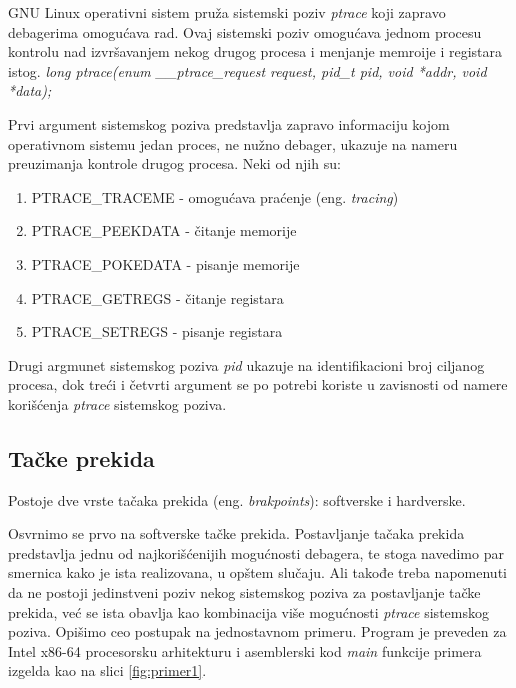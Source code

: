 \documentclass[12pt,oneside]{memoir}
\begin{document}
GNU Linux operativni sistem pruža sistemski poziv \emph{ptrace} koji zapravo debagerima omogućava rad. Ovaj sistemski poziv omogućava jednom procesu kontrolu nad izvršavanjem nekog drugog procesa i menjanje memroije i registara istog.
\newline\newline
\emph{ long ptrace(enum \_\_ptrace\_request request, pid\_t pid, void *addr, void *data);}
\newline

Prvi argument sistemskog poziva predstavlja zapravo informaciju kojom operativnom sistemu jedan proces, ne nužno debager, ukazuje na nameru preuzimanja kontrole drugog procesa. Neki od njih su:

\begin{enumerate}
	\item PTRACE\_TRACEME - omogućava praćenje (eng. \emph{tracing})
	\item PTRACE\_PEEKDATA - čitanje memorije
	\item PTRACE\_POKEDATA - pisanje memorije
	\item PTRACE\_GETREGS - čitanje registara
	\item PTRACE\_SETREGS - pisanje registara
\end{enumerate}
Drugi argmunet sistemskog poziva \emph{pid} ukazuje na identifikacioni broj ciljanog procesa, dok treći i četvrti argument se po potrebi koriste u zavisnosti od namere korišćenja \emph{ptrace} sistemskog poziva. 
\subsection{Tačke prekida}

Postoje dve vrste tačaka prekida (eng. \emph{brakpoints}): softverske i hardverske.

Osvrnimo se prvo na softverske tačke prekida. Postavljanje tačaka prekida predstavlja jednu od najkorišćenijih mogućnosti debagera, te stoga navedimo par smernica kako je ista realizovana, u opštem slučaju. Ali takođe treba napomenuti da ne postoji jedinstveni poziv nekog sistemskog poziva za postavljanje tačke prekida, već se ista obavlja kao kombinacija više mogućnosti \emph{ptrace} sistemskog poziva. Opišimo ceo postupak na jednostavnom primeru. Program je preveden za Intel x86-64 procesorsku arhitekturu i asemblerski kod \emph{main} funkcije primera izgelda kao na slici \ref{fig:primer1}.
\end{document}
